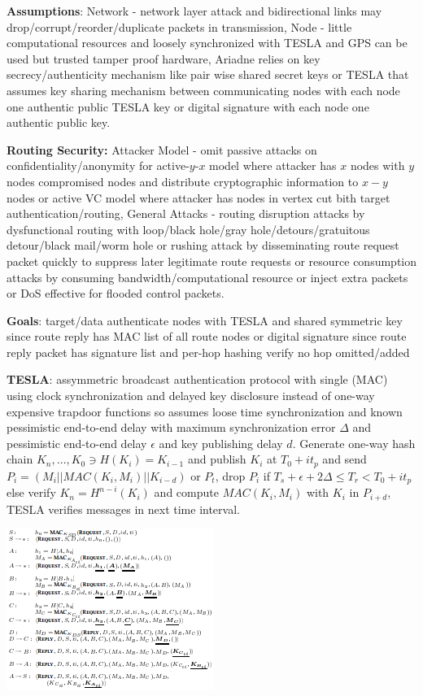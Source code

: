 \documentclass[9pt]{extarticle}
\begin{document}
\begin{multicols}{2}
\textbf{Assumptions}: Network - network layer attack and bidirectional links may drop/corrupt/reorder/duplicate packets in transmission, Node - little computational resources and loosely synchronized with TESLA and GPS can be used but trusted tamper proof hardware, Ariadne relies on key secrecy/authenticity mechanism like pair wise shared secret keys or TESLA that assumes key sharing mechanism between communicating nodes with each node one authentic public TESLA key or digital signature with each node one authentic public key.

\textbf{Routing Security:} Attacker Model - omit passive attacks on confidentiality/anonymity for active-$y$-$x$ model where attacker has $x$ nodes with $y$ nodes compromised nodes and distribute cryptographic information to $x-y$ nodes or active VC model where attacker has nodes in vertex cut bith target authentication/routing, General Attacks - routing disruption attacks by dysfunctional routing with loop/black hole/gray hole/detours/gratuitous detour/black mail/worm hole or rushing attack by disseminating route request packet quickly to suppress later legitimate route requests or resource consumption attacks by consuming bandwidth/computational resource or inject extra packets or DoS effective for flooded control packets.

\textbf{Goals}: target/data authenticate nodes with TESLA and shared symmetric key since route reply has MAC list of all route nodes or digital signature since route reply packet has signature list and per-hop hashing verify  no hop omitted/added

\textbf{TESLA}: assymmetric broadcast authentication protocol with single (MAC) using clock synchronization and delayed key disclosure instead of one-way expensive trapdoor functions so assumes loose time synchronization and known pessimistic end-to-end delay with maximum synchronization error $\Delta$ and pessimistic end-to-end delay $\epsilon$ and key publishing delay $d$. Generate one-way hash chain $K_n,\dots,K_0\ni{H(K_i)=K_{i-1}}$ and publish $K_i$ at $T_0+it_p$ and send $P_i=(M_i||MAC(K_i, M_i)||K_{i-d})$ or $P_t$, drop $P_i$ if ${T_s+\epsilon+2\Delta}\leq{T_r}<T_0+it_p$ else verify $K_n=H^{n-i}(K_i)$ and compute $MAC(K_i,M_i)$ with $K_i$ in $P_{i+d}$, TESLA verifies messages in next time interval. 

\includegraphics{ariadnerreq.png}


\end{multicols}
\end{document}
